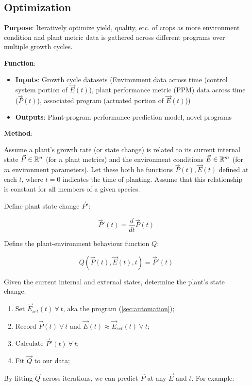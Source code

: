 \subsection{Optimization}
\label{sec:optimization}

\textbf{Purpose}: Iteratively optimize yield, quality, etc. of crops as more environment condition and plant metric data is gathered across different programs over multiple growth cycles.

\textbf{Function}:
\begin{itemize}
    \item \textbf{Inputs}: Growth cycle datasets (Environment data across time (control system portion of $\vec E(t)$), plant performance metric (PPM) data across time ($\vec P(t)$), associated program (actuated portion of $\vec E(t)$))
    \item \textbf{Outputs}: Plant-program performance prediction model, novel programs
\end{itemize}

\textbf{Method}: 

Assume a plant's growth rate (or state change) is related to its current internal state $\vec P \in \mathbb R^n$ (for $n$ plant metrics) and the environment conditions $\vec E \in \mathbb R^m$ (for $m$ environment parameters). Let these both be functions $\vec P (t),\vec E(t)$ defined at each $t$, where $t=0$ indicates the time of planting. Assume that this relationship is constant for all members of a given species.

Define plant state change $\vec P'$: 

$$\vec P'(t) = \frac{d}{dt}\vec P(t)$$

Define the plant-environment behaviour function $Q$: 

$$Q(\vec P(t), \vec E(t), t)=\vec P'(t)$$ 

Given the current internal and external states, determine the plant's state change.

\begin{enumerate}
    \item Set $\vec E_{set}(t)~\forall~ t$, aka the program (\ref{sec:automation});
    \item Record $\vec P(t)~\forall~ t$ and $\vec E(t)\approx \vec E_{set}(t)~\forall~ t$;
    \item Calculate $\vec P'(t)~\forall~ t$;
    \item Fit $\vec Q$ to our data;
\end{enumerate}

By fitting $\vec Q$ across iterations, we can predict $\vec P$ at any $\vec E$ and $t$. For example:

